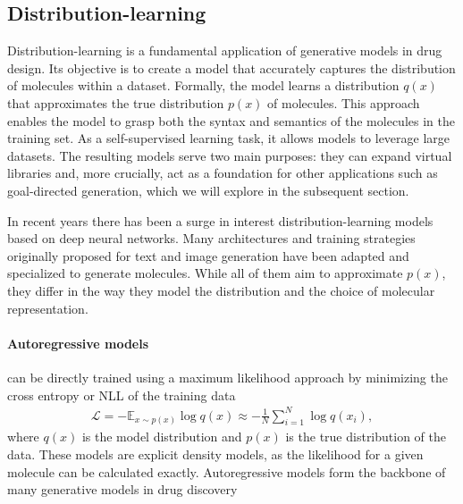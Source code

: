 \subsection{Distribution-learning}
Distribution-learning is a fundamental application of generative models in drug design. Its
objective is to create a model that accurately captures the distribution of molecules within a
dataset. Formally, the model learns a distribution $q(x)$ that approximates the true distribution
$p(x)$ of molecules. This approach enables the model to grasp both the syntax and semantics of the
molecules in the training set. As a self-supervised learning task, it allows models to leverage
large datasets. The resulting models serve two main purposes: they can expand virtual libraries and,
more crucially, act as a foundation for other applications such as goal-directed generation, which
we will explore in the subsequent section.

In recent years there has been a surge in interest distribution-learning models based on deep neural
networks. Many architectures and training strategies originally proposed for text and image
generation have been adapted and specialized to generate molecules. While all of them aim to
approximate $p(x)$, they differ in the way they model the distribution and the choice of molecular
representation.

\paragraph{Autoregressive models} can be directly trained using a maximum likelihood approach by
minimizing the cross entropy or \ac{NLL} of the training data
\begin{align}
    \mathcal{L} = - \mathbb{E}_{x \sim p(x)} \log q(x) \approx - \frac{1}{N} \sum_{i=1}^N \log q(x_i),
\end{align}
where $q(x)$ is the model distribution and $p(x)$ is the true distribution of the data. These models
are explicit density models, as the likelihood for a given molecule can be calculated exactly.
Autoregressive models form the backbone of many generative models in drug discovery
\citep{gomez-bombarelliAutomaticChemicalDesign2018,seglerGeneratingFocusedMolecule2018,olivecronaMolecularDenovoDesign2017,guoAugmentedMemoryCapitalizing2023,thomasAugmentedHillClimbIncreases2022,jaquesSequenceTutorConservative2016,cohen-karlikOvercomingOrderAutoregressive2024,}

